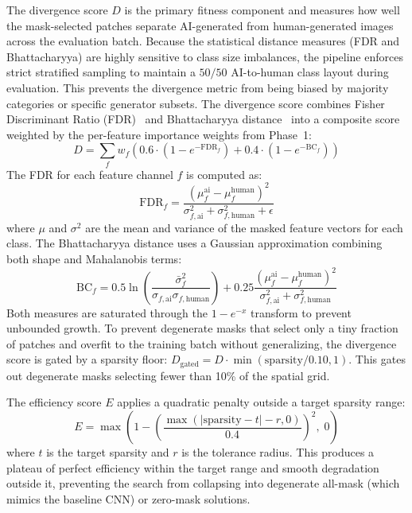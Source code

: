 \documentclass[runningheads]{llncs}
\begin{document}
The divergence score $D$ is the primary fitness component and measures how well the mask-selected patches separate AI-generated from human-generated images across the evaluation batch. Because the statistical distance measures (FDR and Bhattacharyya) are highly sensitive to class size imbalances, the pipeline enforces strict stratified sampling to maintain a $50/50$ AI-to-human class layout during evaluation. This prevents the divergence metric from being biased by majority categories or specific generator subsets. The divergence score combines Fisher Discriminant Ratio (FDR)~\cite{fisher1936use} and Bhattacharyya distance~\cite{bhattacharyya1943measure} into a composite score weighted by the per-feature importance weights from Phase~1:
\begin{equation}
D = \sum_f w_f \left(0.6 \cdot (1 - e^{-\text{FDR}_f}) + 0.4 \cdot (1 - e^{-\text{BC}_f})\right)
\label{eq:divergence}
\end{equation}
The FDR for each feature channel $f$ is computed as:
\begin{equation}
\text{FDR}_f = \frac{(\mu_{f}^{\text{ai}} - \mu_{f}^{\text{human}})^2}{\sigma_{f,\text{ai}}^2 + \sigma_{f,\text{human}}^2 + \epsilon}
\end{equation}
where $\mu$ and $\sigma^2$ are the mean and variance of the masked feature vectors for each class. The Bhattacharyya distance uses a Gaussian approximation combining both shape and Mahalanobis terms:
\begin{equation}
\text{BC}_f = 0.5 \ln\!\left(\frac{\bar{\sigma}_f^2}{\sigma_{f,\text{ai}} \sigma_{f,\text{human}}}\right) + 0.25 \frac{(\mu_f^{\text{ai}} - \mu_f^{\text{human}})^2}{\sigma_{f,\text{ai}}^2 + \sigma_{f,\text{human}}^2}
\end{equation}
Both measures are saturated through the $1 - e^{-x}$ transform to prevent unbounded growth. To prevent degenerate masks that select only a tiny fraction of patches and overfit to the training batch without generalizing, the divergence score is gated by a sparsity floor: $D_{\text{gated}} = D \cdot \min(\text{sparsity}/0.10, 1)$. This gates out degenerate masks selecting fewer than 10\% of the spatial grid.

The efficiency score $E$ applies a quadratic penalty outside a target sparsity range:
\begin{equation}
E = \max\!\left(1 - \left(\frac{\max(|\text{sparsity} - t| - r, 0)}{0.4}\right)^{\!2},\; 0\right)
\end{equation}
where $t$ is the target sparsity and $r$ is the tolerance radius. This produces a plateau of perfect efficiency within the target range and smooth degradation outside it, preventing the search from collapsing into degenerate all-mask (which mimics the baseline CNN) or zero-mask solutions.
\end{document}
